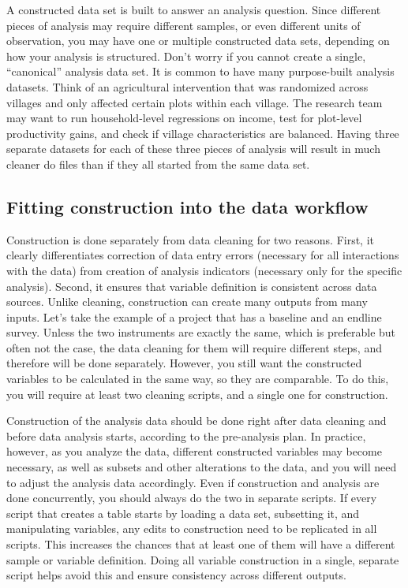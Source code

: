 A constructed data set is built to answer an analysis question.
Since different pieces of analysis may require different samples,
or even different units of observation,
you may have one or multiple constructed data sets,
depending on how your analysis is structured.
Don't worry if you cannot create a single, ``canonical'' analysis data set.
It is common to have many purpose-built analysis datasets.
Think of an agricultural intervention that was randomized across villages
and only affected certain plots within each village.
The research team may want to run household-level regressions on income,
test for plot-level productivity gains,
and check if village characteristics are balanced.
Having three separate datasets for each of these three pieces of analysis
will result in much cleaner do files than if they all started from the same data set.

\subsection{Fitting construction into the data workflow}
Construction is done separately from data cleaning for two reasons.
First, it clearly differentiates correction of data entry errors
(necessary for all interactions with the data)
from creation of analysis indicators (necessary only for the specific analysis).
Second, it ensures that variable definition is consistent across data sources.
Unlike cleaning, construction can create many outputs from many inputs.
Let's take the example of a project that has a baseline and an endline survey.
Unless the two instruments are exactly the same,
which is preferable but often not the case,
the data cleaning for them will require different steps,
and therefore will be done separately.
However, you still want the constructed variables to be calculated in the same way, so they are comparable.
To do this, you will require at least two cleaning scripts,
and a single one for construction.

Construction of the analysis data should be done right after data cleaning and before data analysis starts,
according to the pre-analysis plan.
In practice, however, as you analyze the data,
different constructed variables may become necessary,
as well as subsets and other alterations to the data,
and you will need to adjust the analysis data accordingly.
Even if construction and analysis are done concurrently,
you should always do the two in separate scripts.
If every script that creates a table starts by loading a data set,
subsetting it, and manipulating variables,
any edits to construction need to be replicated in all scripts.
This increases the chances that at least one of them will have a different sample or variable definition.
Doing all variable construction in a single, separate script helps
avoid this and ensure consistency across different outputs.

